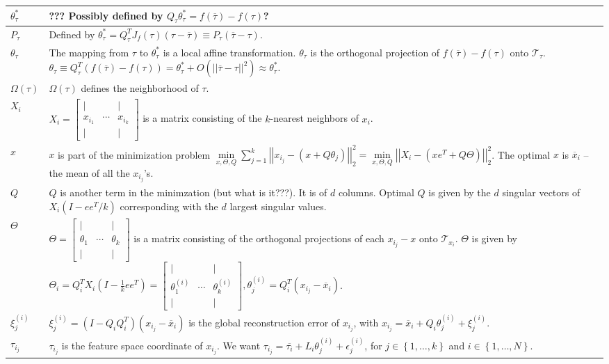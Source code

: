 \documentclass[10pt,letterpaper]{article}
\newcommand{\n}{\hfill\break}
\newcommand{\set}[1]{\left\{#1\right\}}
\newcommand{\abs}[1]{\left|#1\right|}
\newcommand{\norm}[1]{\abs{\abs{#1}}}
\newcommand{\tpose}{^{T}}
\newcommand{\smallBMatrix}[1]{\brack{\begin{smallmatrix}#1\end{smallmatrix}}}
\newcommand{\Tau}{\mathcal{T}}
\renewcommand{\brack}[1]{\left[#1\right]}
\begin{document}
\begin{tabularx}{\linewidth}{|l|>{\raggedright\arraybackslash}X|}
	$\theta_{\tau}^{*}$ & ??? Possibly defined by $Q_{\tau}\theta_{\tau}^{*}=f(\overline{\tau})-f(\tau)$?\\ \hline
	$P_{\tau}$ & Defined by $\theta_{\tau}^{*}=Q_{\tau}\tpose{}J_{f}(\tau)(\tau-\overline{\tau})\equiv{}P_{\tau}(\overline{\tau}-\tau)$.\\ \hline
	$\theta_{\tau}$ & The mapping from $\tau$ to $\theta^{*}_{\tau}$ is a local affine transformation. $\theta_{\tau}$ is the orthogonal projection of $f(\overline{\tau})-f(\tau)$ onto $\Tau_{\tau}$. $\theta_{\tau}\equiv{}Q_{\tau}\tpose(f(\overline{\tau})-f(\tau))=\theta_{\tau}^{*}+O(\norm{\overline{\tau}-\tau}^{2})\approx\theta_{\tau}^{*}$.\\ \hline
	$\Omega(\tau)$ & $\Omega(\tau)$ defines the neighborhood of $\tau$.\\ \hline
	$X_{i}$ & $X_{i}=\smallBMatrix{| & & |\\ x_{i_{1}} & \cdots & x_{i_{k}}\\ | & & |}$ is a matrix consisting of the $k$-nearest neighbors of $x_{i}$.\\ \hline
	$x$ & $x$ is part of the minimization problem\n
	$\displaystyle\underset{x,\Theta,Q}{\min}\sum_{j=1}^{k}\norm{x_{i_{j}}-(x+Q\theta_{j})}_{2}^{2}=\underset{x,\Theta,Q}{\min}\norm{X_{i}-(xe\tpose+Q\Theta)}_{2}^{2}$.\n
	The optimal $x$ is $\overline{x}_{i}$ -- the mean of all the $x_{i_{j}}$'s.\\ \hline
	$Q$ & $Q$ is another term in the minimzation (but what is it???). It is of $d$ columns. Optimal $Q$ is given by the $d$ singular vectors of $X_{i}(I-ee\tpose/k)$ corresponding with the $d$ largest singular values.\\ \hline
	$\Theta$ & $\Theta=\smallBMatrix{| & & |\\ \theta_{1} & \cdots & \theta_{k}\\ | & & |}$ is a matrix consisting of the orthogonal projections of each $x_{i_{j}}-x$ onto $\Tau_{x_{i}}$. $\Theta$ is given by $\Theta_{i}=Q_{i}\tpose{}X_{i}(I-\frac{1}{k}ee\tpose)=\smallBMatrix{| & & |\\ \theta_{1}^{(i)} & \cdots & \theta_{k}^{(i)}\\ | & & |},\theta_{j}^{(i)}=Q_{i}\tpose(x_{i_{j}}-\overline{x}_{i})$.\\ \hline
	$\xi_{j}^{(i)}$ & $\xi_{j}^{(i)}=(I-Q_{i}Q_{i}\tpose)(x_{i_{j}}-\overline{x}_{i})$ is the global reconstruction error of $x_{i_{j}}$, with $x_{i_{j}}=\overline{x}_{i}+Q_{i}\theta_{j}^{(i)}+\xi_{j}^{(i)}$.\\ \hline
	$\tau_{i_{j}}$ & $\tau_{i_{j}}$ is the feature space coordinate of $x_{i_{j}}$. We want $\tau_{i_{j}}=\overline{\tau_{i}}+L_{i}\theta_{j}^{(i)}+\epsilon_{j}^{(i)}$, for $j\in\set{1,\ldots,k}$ and $i\in\set{1,\ldots,N}$.\\ \hline

\end{tabularx}
\end{document}
